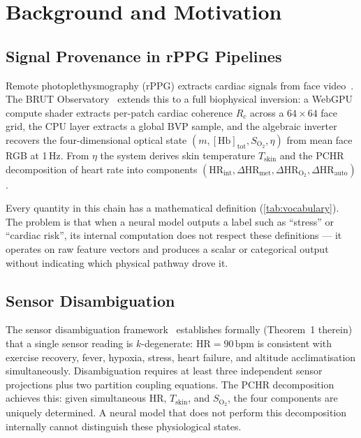\documentclass[10pt,twocolumn,a4paper]{article}
\theoremstyle{definition}
\theoremstyle{remark}
\newcommand{\HR}{\mathrm{HR}}
\newcommand{\Rc}{R_c}
\newcommand{\vaso}{\eta}
\newcommand{\melan}{m}
\newcommand{\Hbconc}{[\mathrm{Hb}]_{\mathrm{tot}}}
\newcommand{\Soxy}{S_{\mathrm{O_2}}}
\begin{document}
\section{Background and Motivation}
\label{sec:background}

\subsection{Signal Provenance in rPPG Pipelines}

Remote photoplethysmography (rPPG) extracts cardiac signals from face
video~\cite{verkruysse2008,wang2017posrPPG,dehaan2013chrom}.  The BRUT
Observatory~\cite{sachikonye2024optical} extends this to a full
biophysical inversion: a WebGPU compute shader extracts per-patch cardiac
coherence $\Rc$ across a $64\times64$ face grid, the CPU layer extracts
a global BVP sample, and the algebraic inverter recovers the four-dimensional
optical state $(\melan, \Hbconc, \Soxy, \vaso)$ from mean face RGB at
1\,Hz.  From $\vaso$ the system derives skin temperature $T_{\mathrm{skin}}$
and the PCHR decomposition of heart rate into components $(\HR_{\mathrm{int}},
\Delta\HR_{\mathrm{met}}, \Delta\HR_{\mathrm{O}_2}, \Delta\HR_{\mathrm{auto}})$.

Every quantity in this chain has a mathematical definition
(\cref{tab:vocabulary}).  The problem is that when a neural model outputs
a label such as ``stress'' or ``cardiac risk'', its internal computation
does not respect these definitions --- it operates on raw feature vectors
and produces a scalar or categorical output without indicating which
physical pathway drove it.

\subsection{Sensor Disambiguation}

The sensor disambiguation framework~\cite{sachikonye2024disambiguation}
establishes formally (Theorem~1 therein) that a single sensor reading is
$k$-degenerate: $\HR = 90\,\mathrm{bpm}$ is consistent with exercise
recovery, fever, hypoxia, stress, heart failure, and altitude
acclimatisation simultaneously.  Disambiguation requires at least three
independent sensor projections plus two partition coupling equations.
The PCHR decomposition achieves this: given simultaneous $\HR$,
$T_{\mathrm{skin}}$, and $\Soxy$, the four components are uniquely
determined.  A neural model that does not perform this decomposition
internally cannot distinguish these physiological states.
\end{document}
